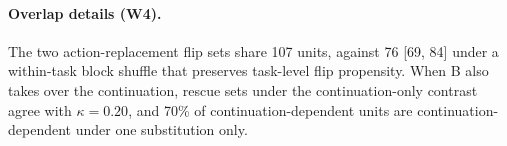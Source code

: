 \paragraph{Overlap details (W4).} The two action-replacement flip sets share 107 units, against 76 [69, 84] under a within-task block shuffle that preserves task-level flip propensity. %
When B also takes over the continuation, rescue sets under the continuation-only contrast agree with $\kappa=0.20$, and 70\% of continuation-dependent units are continuation-dependent under one substitution only. %


